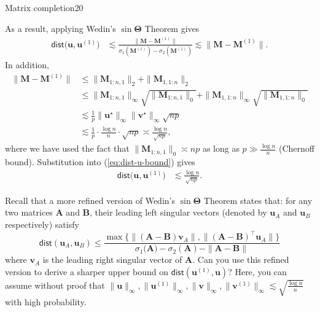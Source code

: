 \documentclass{article}
\begin{document}
\begin{problem}{Matrix completion}{20}
{As a result, applying Wedin's $\sin\bm{\Theta}$ Theorem gives
\begin{align}
\mathsf{dist}\big( {\bm{u}}, {\bm{u}}^{(1)}\big) & \lesssim\frac{\| {\bm{M}}- {\bm{M}}^{(1)}\|}{\sigma_{1}( {\bm{M}}^{(1)})-\sigma_{2}( {\bm{M}}^{(1)})}\lesssim\| {\bm{M}}- {\bm{M}}^{(1)}\|.\label{eq:dist-u-bound}
\end{align}
In addition, 
\begin{align*}
\| {\bm{M}}- {\bm{M}}^{(1)}\| & \leq\| {\bm{M}}_{1:n,1}\|_{2}+\| {\bm{M}}_{1,1:n}\|_{2}\\
 & \leq\| {\bm{M}}_{1:n,1}\|_{\infty}\sqrt{\| {\bm{M}}_{1:n,1}\|_{0}}+\| {\bm{M}}_{1,1:n}\|_{\infty}\sqrt{\| {\bm{M}}_{1,1:n}\|_{0}}\\
 & \lesssim\frac{1}{p}\|\bm{u}^\star\|_{\infty}\|\bm{v}^\star\|_{\infty}\sqrt{np}\\
 & \lesssim\frac{1}{p}\cdot\frac{\log n}{n}\cdot\sqrt{np}\asymp\frac{\log n}{\sqrt{np}},
\end{align*}
where we have used the fact that $\| {\bm{M}}_{1:n,1}\|_{0}\asymp np$
as long as $p\gg\frac{\log n}{n}$ (Chernoff bound). Substitution
into (\ref{eq:dist-u-bound}) gives
\begin{align}
\mathsf{dist}\big( {\bm{u}}, {\bm{u}}^{(1)}\big) & \lesssim\frac{\log n}{\sqrt{np}}.\label{eq:dist-u-bound-1}
\end{align}



}

 Recall that a more refined version of Wedin's $\sin\bm{\Theta}$ Theorem states that: for any two matrices $\bm{A}$ and $\bm{B}$, their leading left singular vectors (denoted by $\bm{u}_A$ and $\bm{u}_B$ respectively) satisfy
%
\[
\mathsf{dist}(\bm{u}_{A},\bm{u}_{B})\leq\frac{\max\big\{\big\|(\bm{A}-\bm{B})\bm{v}_{A}\big\|,\big\|(\bm{A}-\bm{B})^{\top}\bm{u}_{A}\big\|\big\}}{\sigma_{1}\big(\bm{A}\big)-\sigma_{2}(\bm{A})-\|\bm{A}-\bm{B}\|}
\]
%
where $\bm{v}_A$ is the leading right singular vector of $\bm{A}$. Can you use this refined version to derive a sharper upper bound on $\mathsf{dist}({\bm{u}}^{(1)},{\bm{u}})$?  Here, you can assume without proof that $\| {\bm{u}} \|_{\infty} , \| {\bm{u}}^{(1)} \|_{\infty}, \| {\bm{v}} \|_{\infty} , \| {\bm{v}}^{(1)} \|_{\infty} \lesssim \sqrt{ \frac{\log n}{n} }$ with high probability. 


\end{problem}
\end{document}
